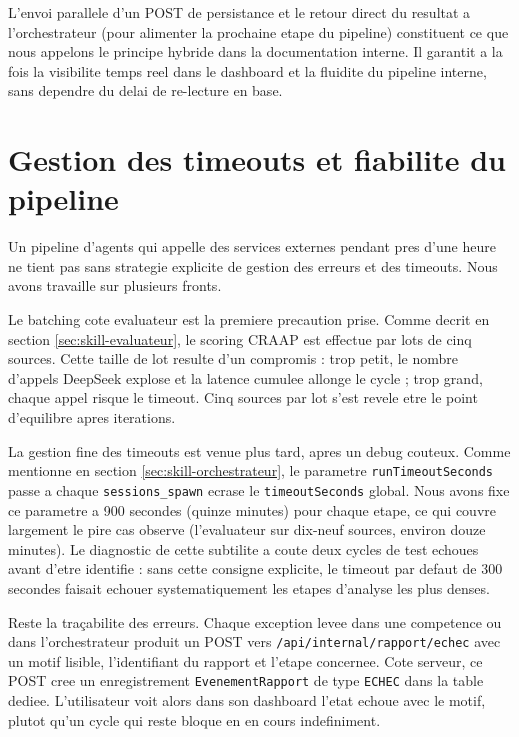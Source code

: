 \documentclass[12pt,a4paper,openany]{report}
\begin{document}
L'envoi parallele d'un POST de persistance et le retour direct du resultat a l'orchestrateur (pour alimenter la prochaine etape du pipeline) constituent ce que nous appelons le \og principe hybride \fg{} dans la documentation interne. Il garantit a la fois la visibilite temps reel dans le dashboard et la fluidite du pipeline interne, sans dependre du delai de re-lecture en base.

\section{Gestion des timeouts et fiabilite du pipeline}
\label{sec:timeouts-fiabilite}

Un pipeline d'agents qui appelle des services externes pendant pres d'une heure ne tient pas sans strategie explicite de gestion des erreurs et des timeouts. Nous avons travaille sur plusieurs fronts.

Le batching cote evaluateur est la premiere precaution prise. Comme decrit en section \ref{sec:skill-evaluateur}, le scoring CRAAP est effectue par lots de cinq sources. Cette taille de lot resulte d'un compromis : trop petit, le nombre d'appels DeepSeek explose et la latence cumulee allonge le cycle ; trop grand, chaque appel risque le timeout. Cinq sources par lot s'est revele etre le point d'equilibre apres iterations.

La gestion fine des timeouts est venue plus tard, apres un debug couteux. Comme mentionne en section \ref{sec:skill-orchestrateur}, le parametre \texttt{runTimeoutSeconds} passe a chaque \texttt{sessions\_spawn} ecrase le \texttt{timeoutSeconds} global. Nous avons fixe ce parametre a 900 secondes (quinze minutes) pour chaque etape, ce qui couvre largement le pire cas observe (l'evaluateur sur dix-neuf sources, environ douze minutes). Le diagnostic de cette subtilite a coute deux cycles de test echoues avant d'etre identifie : sans cette consigne explicite, le timeout par defaut de 300 secondes faisait echouer systematiquement les etapes d'analyse les plus denses.

Reste la traçabilite des erreurs. Chaque exception levee dans une competence ou dans l'orchestrateur produit un POST vers \texttt{/api/internal/rapport/echec} avec un motif lisible, l'identifiant du rapport et l'etape concernee. Cote serveur, ce POST cree un enregistrement \texttt{EvenementRapport} de type \texttt{ECHEC} dans la table dediee. L'utilisateur voit alors dans son dashboard l'etat \og echoue \fg{} avec le motif, plutot qu'un cycle qui reste bloque en \og en cours \fg{} indefiniment.
\end{document}
